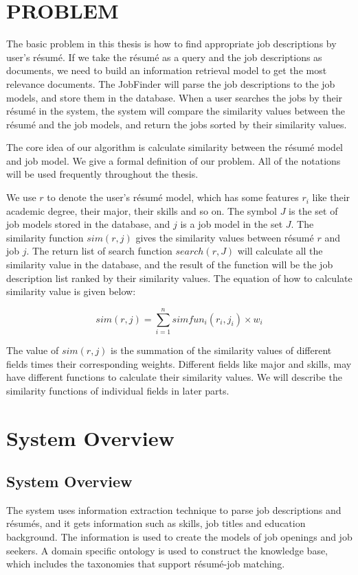 \chapter{PROBLEM}

The basic problem in this thesis is how to find appropriate job descriptions by user's r\'esum\'e. If we take the r\'esum\'e as a query and the job descriptions as documents, we need to build an information retrieval model to get the most relevance documents.  The JobFinder will parse the job descriptions to the job models, and store them in the database. When a user searches the jobs by their r\'esum\'e in the system, the system will compare the similarity values between the r\'esum\'e and the job models, and return the jobs sorted by their similarity values.

The core idea of our algorithm is calculate similarity between the r\'esum\'e model and job model.
We give a formal definition of our problem. All of the notations will be used frequently throughout the thesis.

We use $r$ to denote the user's r\'esum\'e model, which has some features $r_i$ like their academic degree, their major, their skills and so on. The symbol $J$ is the set of job models stored in the database, and $j$ is a job model in the set $J$. The similarity function $sim(r, j)$ gives the similarity values between r\'esum\'e $r$ and job $j$. The return list of search function $search(r,J)$ will calculate all the similarity value in the database, and the result of the function will be the job description list ranked by their similarity values. The equation of how to calculate similarity value is given below:

$$ sim(r, j) = \sum_{i=1}^{n} simfun_i(r_i,j_i) \times w_i $$

The value of $sim(r, j)$ is the summation of the similarity values of different fields times their corresponding weights. Different fields like major and skills,  may have different functions to calculate their similarity values. We will describe the similarity functions of individual fields in later parts.


\chapter{System Overview}

\section{System Overview}
The system uses information extraction technique to parse job descriptions and r\'esum\'es, and it gets information such as skills, job titles and education background. The information is used to create the models of job openings and job seekers. A domain specific ontology is used to construct the knowledge base, which includes the taxonomies that support r\'esum\'e-job matching.

